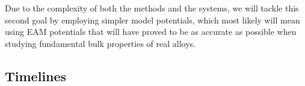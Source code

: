 Due to the complexity of both the methods and the systems, we will tackle this second goal by employing simpler model potentials, which most likely will mean using EAM potentials that will have proved to be as accurate as possible when studying fundamental bulk properties of real alloys.










\cleardoublepage
\begin{landscape}
\thispagestyle{empty}
\subsection{Timelines}
\begin{figure}[h]
    \centering
    \resizebox{\Textht}{!}{%
        
    }
\end{figure}
\end{landscape}